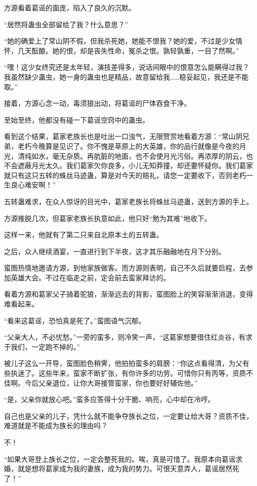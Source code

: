 \begin{this_body}
方源看着葛谣的面庞，陷入了良久的沉默。

“居然将蛊虫全部留给了我？什么意思？”

“她的确爱上了常山阴不假，但我杀死她，她能不恨我？她的爱，不过是少女情怀，几天酝酿。她的恨，却是丧失性命，冤杀之恨。孰轻孰重，一目了然啊。”

“嘿！这少女终究还是太年轻，演技差得多，说话间眼中的恨意怎么能瞒得过我？我虽然缺少蛊虫，她一身的蛊虫也是精品，故意留给我……稳妥起见，我还是不能取。”

接着，方源心念一动，毒须狼出动，将葛谣的尸体吞食干净。

至始至终，他都没有碰一下葛谣空窍中的蛊虫。

看到这个结果，葛家老族长也是吐出一口浊气，无限赞赏地看着方源：“常山阴兄弟，老朽今晚算是见识了。你不愧是草原上的大英雄，你的品行就像是今夜的月光，清纯如水，毫无杂质。再肮脏的地面，也不会使月光污俗。再浓厚的阴云，也不会遮蔽月光太久。我们葛家欠你良多，小儿无知莽撞，却还要怀疑你。我们葛家就只有这只五转的蛛丝马迹蛊，算是对今天的赔礼，请您一定要收下，否则老朽一生良心难安啊！”

五转蛊难求，在众人惊讶的目光中，葛家老族长将蛛丝马迹蛊，送到方源的手上。

方源推脱几次，但葛家老族长执意如此，他只好“勉为其难”地收下。

这样一来，他就有了第二只来自北原本土的五转蛊。

之后，众人继续酒宴，一直进行到下半夜，这才其乐融融地在月下分别。

蛮图热情地邀请方源，到他家族做客。而方源则表明，自己不久后就要启程，去参加英雄大会。不过在临走之前，定会前去蛮家拜访的。

看着方源和葛家父子骑着驼狼，渐渐远去的背影，蛮图脸上的笑容渐渐消退，变得难看起来。

“看来这葛谣，恐怕真是死了。”蛮图语气沉郁。

“父亲大人，不必忧愁。”一旁的蛮多，则冷笑一声，“这葛家想要借住红炎谷，有求于我们，一定跑不掉的。”

被儿子这么一开导，蛮图脸色稍霁，他拍拍蛮多的肩膀：“你这点看得清，为父有些执迷了。这些年来，蛮家不断扩张，有你许多的功劳。可惜你只有丙等，资质不佳啊。今后父亲退位，让你大哥接管蛮家，你也要好好辅佐他。”

“是，父亲你就放心吧。”蛮多应答得十分干脆、响亮，心中却在冷哼。

自己也是父亲的儿子，凭什么就不能争夺族长之位，一定要让给大哥？资质不佳，难道就是不能成为族长的理由吗？

不！

“如果大哥登上族长之位，一定会整死我的。唉，真是可惜了。我原本向葛谣求婚，就是想将葛家成为我的妻族，成为我的势力。可恨天意弄人，葛谣居然死了！”


\end{this_body}
